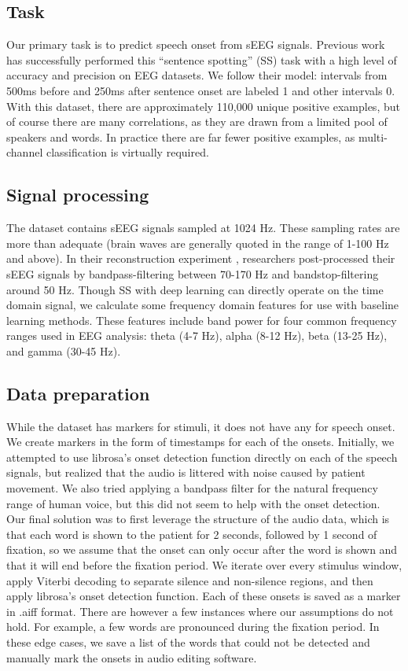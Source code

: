 \documentclass[format=sigconf, nonacm=true, review=true, screen=true]{acmart}
\begin{document}
\subsection{Task}

Our primary task is to predict speech onset from sEEG signals. Previous work has successfully performed this ``sentence spotting'' (SS) task with a high level of accuracy and precision on EEG datasets. \cite{sakthi2021keyword} We follow their model: intervals from 500ms before and 250ms after sentence onset are labeled 1 and other intervals 0. With this dataset, there are approximately 110,000 unique positive examples, but of course there are many correlations, as they are drawn from a limited pool of speakers and words. In practice there are far fewer positive examples, as multi-channel classification is virtually required.

\subsection{Signal processing}

The dataset contains sEEG signals sampled at 1024 Hz. These sampling rates are more than adequate (brain waves are generally quoted in the range of 1-100 Hz and above). In their reconstruction experiment \cite{verwoert2022dataset}, researchers post-processed their sEEG signals by bandpass-filtering between 70-170 Hz and bandstop-filtering around 50 Hz. Though SS with deep learning \cite{sakthi2021keyword} can directly operate on the time domain signal, we calculate some frequency domain features for use with baseline learning methods. These features include band power for four common frequency ranges used in EEG analysis: theta (4-7 Hz), alpha (8-12 Hz), beta (13-25 Hz), and gamma (30-45 Hz).

\subsection{Data preparation}

While the dataset has markers for stimuli, it does not have any for speech onset. We create markers in the form of timestamps for each of the onsets. Initially, we attempted to use librosa's onset detection function directly on each of the speech signals, but realized that the audio is littered with noise caused by patient movement. We also tried applying a bandpass filter for the natural frequency range of human voice, but this did not seem to help with the onset detection. Our final solution was to first leverage the structure of the audio data, which is that each word is shown to the patient for 2 seconds, followed by 1 second of fixation, so we assume that the onset can only occur after the word is shown and that it will end before the fixation period. We iterate over every stimulus window, apply Viterbi decoding to separate silence and non-silence regions, and then apply librosa's onset detection function. Each of these onsets is saved as a marker in .aiff format. There are however a few instances where our assumptions do not hold. For example, a few words are pronounced during the fixation period. In these edge cases, we save a list of the words that could not be detected and manually mark the onsets in audio editing software.
\end{document}
